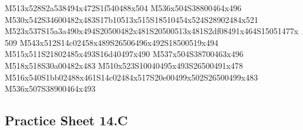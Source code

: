 \documentclass{article}
\begin{document}
\begin{multicols}{5}
\begin{center}
M513x528S2a538494x472S1f540488x504 %
M536x504S38800464x496 %
M530x542S34600482x483S17b10513x515S18510454x524S28902484x521 %
M523x537S15a3a490x494S20500482x481S20500513x481S2df08491x464S15051477x509 %
M543x512S14c02458x489S26506496x492S18500519x494 %
M515x511S21802485x493S16d40497x490 %
M537x504S38700463x496 %
M518x518S30a00482x483 %
M510x523S10040495x493S26500491x478 %
M516x540S1bb02488x461S14c02484x517S20e00499x502S26500499x483 %
M536x507S38900464x493 %
\vfil

\end{center}
\end{multicols}

\subsection{Practice Sheet 14.C}
\end{document}
